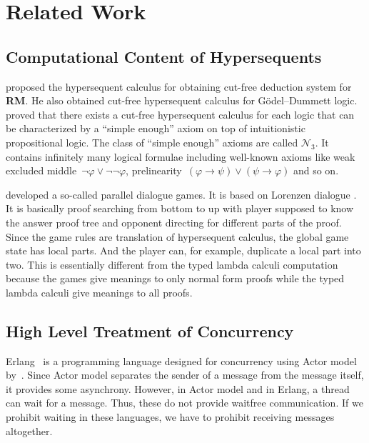 \section{Related Work}

\subsection{Computational Content of Hypersequents}

\citet{RM} proposed the hypersequent calculus for obtaining
cut-free deduction system for \textbf{RM}.
He also obtained cut-free hypersequent calculus for G\"odel--Dummett
logic.
\citet*{alg} proved that there exists a cut-free hypersequent calculus
for each logic that can be characterized by a ``simple enough'' axiom on
top of intuitionistic propositional logic.  The class of ``simple
enough'' axioms are called $\mathcal N_3$.  It contains infinitely many
logical formulae including well-known axioms like weak excluded
middle~$\neg\varphi\vee\neg\neg\varphi$,
prelinearity~$(\varphi\rightarrow\psi)\vee(\psi\rightarrow\varphi)$ and so on.

\citet{parallel} developed a so-called parallel dialogue games.  It is
based on Lorenzen dialogue .  It is basically proof searching from
bottom to up with player supposed
to know the answer proof tree and opponent directing for different parts
of the proof.  Since the game rules are translation of hypersequent
calculus, the global game state has local parts.  And the player can,
for example, duplicate a local part into two.  This is essentially
different from the typed lambda calculi computation because the games
give meanings to only normal form proofs while the typed lambda calculi
give meanings to all proofs.

\subsection{High Level Treatment of Concurrency}

Erlang~\citep{erlang} is a programming language designed for concurrency
using Actor
model by~\citet{actor}.
Since Actor model separates the sender of a message from the message
itself, it provides some asynchrony.  However, in Actor model and in
Erlang, a thread can wait for a message.  Thus, these do not provide
waitfree communication.  If we prohibit waiting in these languages,
we have to prohibit
receiving messages altogether.


